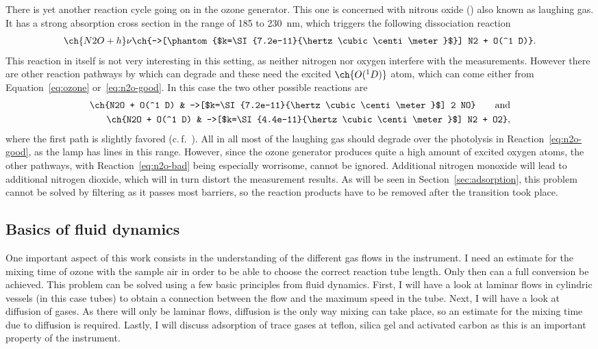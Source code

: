 There is yet another reaction cycle going on in the ozone
generator. This one is concerned with nitrous oxide () also
known as laughing gas. It has a strong absorption cross section in the
range of \num{185} to \SI{230}{\nano\meter}, which triggers the
following dissociation reaction
\begin{align}
  \ch{N2O + h}\nu \ch{->[\phantom{$k=\SI{7.2e-11}{\hertz\cubic\centi\meter}$}] N2 + O(^1 D)}.\label{eq:n2o-good}
\end{align}
This reaction in itself is not very interesting in this setting, as
neither nitrogen nor oxygen interfere with the measurements. However
there are other reaction pathways by which  can degrade and
these need the excited $\ch{O(^1D)}$ atom, which can come either from
Equation~\eqref{eq:ozone} or~\eqref{eq:n2o-good}. In this case the two
other possible reactions are
\begin{align}
  \ch{N2O + O(^1 D) & ->[$k=\SI{7.2e-11}{\hertz\cubic\centi\meter}$] 2 NO} \qquad \text{and}\label{eq:n2o-bad}\\
  \ch{N2O + O(^1 D) & ->[$k=\SI{4.4e-11}{\hertz\cubic\centi\meter}$] N2 + O2}, \nonumber
\end{align}
where the first path is slightly favored (c.\,f.~\cite{n2o}). All in
all most of the laughing gas should degrade over the photolysis in
Reaction~\eqref{eq:n2o-good}, as the lamp has lines in this range.
However, since the ozone generator produces quite a high amount of
excited oxygen atoms, the other pathways, with
Reaction~\eqref{eq:n2o-bad} being especially worrisome, cannot be
ignored. Additional nitrogen monoxide will lead to additional nitrogen
dioxide, which will in turn distort the measurement results. As
will be seen in Section~\ref{sec:adsorption}, this problem cannot be
solved by filtering  as it passes most barriers, so the
reaction products have to be removed after the transition took place.

\subsection{Basics of fluid dynamics}
\label{sec:fluid}

One important aspect of this work consists in the understanding of the
different gas flows in the instrument. I need an estimate for the
mixing time of ozone with the sample air in order to be able to choose
the correct reaction tube length. Only then can a full conversion be
achieved. This problem can be solved using a few basic principles from
fluid dynamics. First, I will have a look at laminar flows in
cylindric vessels (in this case tubes) to obtain a connection between the
flow and the maximum speed in the tube. Next, I will have a look at
diffusion of gases. As there will only be laminar flows, diffusion is
the only way mixing can take place, so an estimate for the mixing time
due to diffusion is required. Lastly, I will discuss adsorption of
trace gases at teflon, silica gel and activated carbon as this is an
important property of the instrument.

